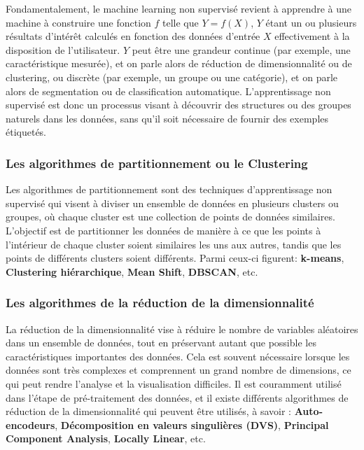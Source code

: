 Fondamentalement, le machine learning non supervisé revient à apprendre à une machine à construire une fonction \( f \) telle que \( Y = f(X) \), \( Y \) étant un ou plusieurs résultats d'intérêt calculés en fonction des données d'entrée \( X \) effectivement à la disposition de l'utilisateur. \( Y \) peut être une grandeur continue (par exemple, une caractéristique mesurée), et on parle alors de réduction de dimensionnalité ou de clustering, ou discrète (par exemple, un groupe ou une catégorie), et on parle alors de segmentation ou de classification automatique. L'apprentissage non supervisé est donc un processus visant à découvrir des structures ou des groupes naturels dans les données, sans qu'il soit nécessaire de fournir des exemples étiquetés.

\subsubsection{Les algorithmes de partitionnement ou le Clustering}
Les algorithmes de partitionnement sont des techniques d'apprentissage non supervisé qui visent à diviser un ensemble de données en plusieurs clusters ou groupes, où chaque cluster est une collection de points de données similaires. L'objectif est de partitionner les données de manière à ce que les points à l'intérieur de chaque cluster soient similaires les uns aux autres, tandis que les points de différents clusters soient différents. Parmi ceux-ci figurent: \textbf{k-means}, \textbf{Clustering hiérarchique}, \textbf{Mean Shift}, \textbf{DBSCAN}, etc.

\subsubsection{Les algorithmes de la réduction de la dimensionnalité}
La réduction de la dimensionnalité vise à réduire le nombre de variables aléatoires dans un ensemble de données, tout en préservant autant que possible les caractéristiques importantes des données. Cela est souvent nécessaire lorsque les données sont très complexes et comprennent un grand nombre de dimensions, ce qui peut rendre l'analyse et la visualisation difficiles. Il est couramment utilisé dans l'étape de pré-traitement des données, et il existe différents algorithmes de réduction de la dimensionnalité qui peuvent être utilisés, à savoir : \textbf{Auto-encodeurs}, \textbf{Décomposition en valeurs singulières (DVS)}, \textbf{Principal Component Analysis}, \textbf{Locally Linear}, etc.


